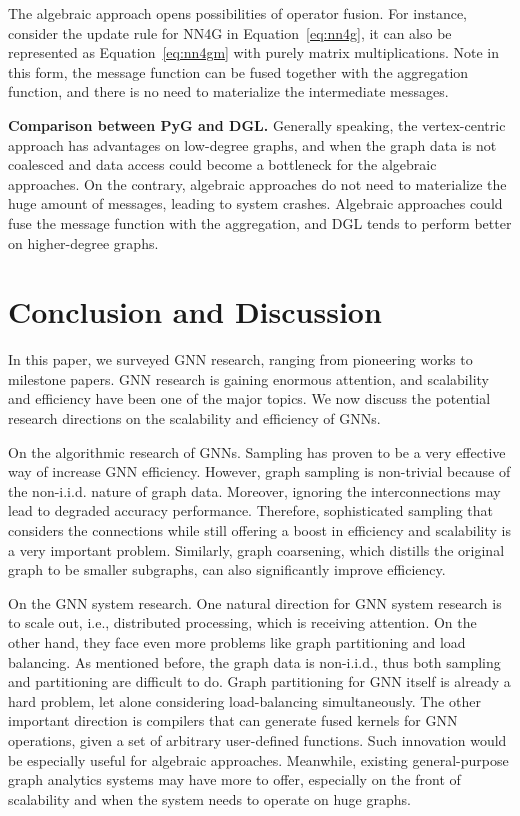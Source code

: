 The algebraic approach opens possibilities of operator fusion. For instance, consider the update rule for NN4G in Equation~\ref{eq:nn4g}, it can also be represented as Equation~\ref{eq:nn4gm} with purely matrix multiplications. Note in this form, the message function can be fused together with the aggregation function, and there is no need to materialize the intermediate messages.


\vspace{2mm}
\noindent \textbf{Comparison between PyG and DGL.} Generally speaking, the vertex-centric approach has advantages on low-degree graphs, and when the graph data is not coalesced and data access could become a bottleneck for the algebraic approaches. On the contrary, algebraic approaches do not need to materialize the huge amount of messages, leading to system crashes. Algebraic approaches could fuse the message function with the aggregation, and DGL tends to perform better on higher-degree graphs.

 

\section{Conclusion and Discussion}
\label{sec:conclusion}
In this paper, we surveyed GNN research, ranging from pioneering works to milestone papers. GNN research is gaining enormous attention, and scalability and efficiency have been one of the major topics.
We now discuss the potential research directions on the scalability and efficiency of GNNs.

On the algorithmic research of GNNs. Sampling has proven to be a very effective way of increase GNN efficiency. However, graph sampling is non-trivial because of the non-i.i.d. nature of graph data. Moreover, ignoring the interconnections may lead to degraded accuracy performance. Therefore, sophisticated sampling that considers the connections while still offering a boost in efficiency and scalability is a very important problem. Similarly, graph coarsening, which distills the original graph to be smaller subgraphs, can also significantly improve efficiency.

On the GNN system research. One natural direction for GNN system research is to scale out, i.e., distributed processing, which is receiving attention. On the other hand, they face even more problems like graph partitioning and load balancing. As mentioned before, the graph data is non-i.i.d., thus both sampling and partitioning are difficult to do. Graph partitioning for GNN itself is already a hard problem, let alone considering load-balancing simultaneously. The other important direction is compilers that can generate fused kernels for GNN operations, given a set of arbitrary user-defined functions. Such innovation would be especially useful for algebraic approaches. Meanwhile, existing general-purpose graph analytics systems may have more to offer, especially on the front of scalability and when the system needs to operate on huge graphs.

